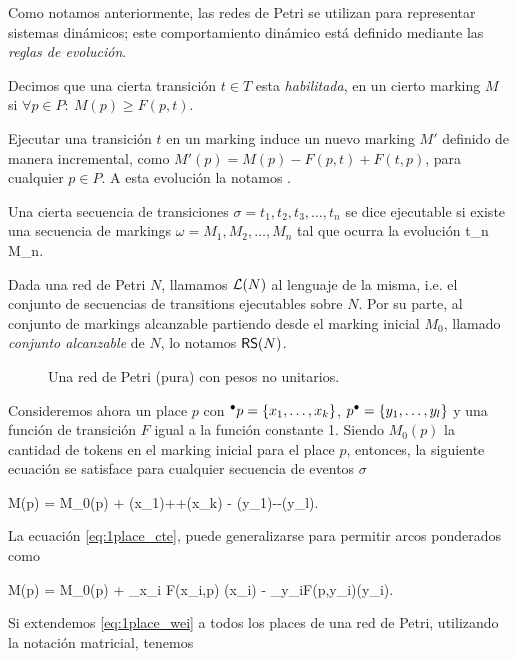 Como notamos anteriormente, las redes de Petri se utilizan para representar sistemas 
dinámicos; este comportamiento dinámico está definido mediante las \emph{reglas de evolución}.

Decimos que una cierta transición $t \in T$ esta \emph{habilitada},
en un cierto marking $M$ si \mbox{$\forall p \in P:~ M(p) \ge F(p,t) $}.

Ejecutar una transición $t$ en un marking induce un nuevo marking $M'$
definido de manera incremental, como  \mbox{$M'(p) = M(p) - F(p,t) +  F(t,p)$},
para cualquier $p \in P$. A esta evolución la notamos .

Una cierta secuencia de transiciones \mbox{$\sigma = t_1,t_2, t_3, \ldots, t_n$}
se dice ejecutable si existe una secuencia de markings \mbox{$\omega = M_1, M_2, \ldots, M_n$}
tal que ocurra la evolución
 {t_n} {M_n}.

Dada una red de Petri $N$, llamamos $\mathcal{L}(N)$ al lenguaje de la misma, i.e.
el conjunto de secuencias de transitions ejecutables sobre $N$.
Por su parte, al conjunto de markings alcanzable partiendo desde el marking inicial $M_0$,
llamado \emph{conjunto alcanzable} de $N$, lo notamos $\textsf{RS}(N)$.

\begin{figure}[t]
  	\centering
    
    \caption{Una red de Petri (pura) con pesos no unitarios.}
    \label{fig:pn1}
\end{figure}

Consideremos ahora un place $p$ con
\mbox{$\mbox{$^\bullet p$}=\{x_1,\ldots,x_k\}$},
\mbox{$\mbox{$p^\bullet$}=\{y_1,\ldots,y_l\}$} y una función de transición 
$F$ igual a la función constante 1.
Siendo $M_0(p)$ la cantidad de tokens en el marking inicial 
para el place $p$, entonces, la siguiente ecuación
se satisface para cualquier secuencia de eventos $\sigma$

M(p) = M_0(p) + \widehat\sigma(x_1)+\cdots +\widehat\sigma(x_k) -
\widehat\sigma(y_1)-\cdots -\widehat\sigma(y_l).
\eequation

La ecuación \eqref{eq:1place_cte}, puede generalizarse para permitir arcos
ponderados como

M(p) = M_0(p) + \sum_{x_i \in {}}F(x_i,p)\cdot
\widehat\sigma(x_i) -
\sum_{y_i\in{}}F(p,y_i)\cdot\widehat\sigma(y_i).
\eequation

Si extendemos \eqref{eq:1place_wei} a todos los places de una red de Petri,
utilizando la notación matricial, tenemos

